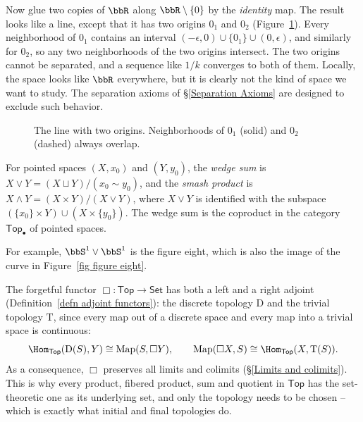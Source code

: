 \begin{example}\label{example two origins}
    Now glue two copies of $\bbR$ along $\bbR\setminus\{0\}$ by the \emph{identity} map. The result looks like a line, except that it has two origins $0_1$ and $0_2$ (Figure~\ref{fig two origins}). Every neighborhood of $0_1$ contains an interval $(-\epsilon,0)\cup\{0_1\}\cup(0,\epsilon)$, and similarly for $0_2$, so any two neighborhoods of the two origins intersect. The two origins cannot be separated, and a sequence like $1/k$ converges to both of them. Locally, the space looks like $\bbR$ everywhere, but it is clearly not the kind of space we want to study. The separation axioms of \S\ref{Separation Axioms} are designed to exclude such behavior.
\end{example}

\begin{figure}[tp]
    \centering
    \caption{The line with two origins. Neighborhoods of $0_1$ (solid) and $0_2$ (dashed) always overlap.}
    \label{fig two origins}
\end{figure}

\begin{defn}
    For pointed spaces $(X,x_0)$ and $(Y,y_0)$, the \emph{wedge sum} is $X\vee Y=(X\sqcup Y)/(x_0\sim y_0)$, and the \emph{smash product} is $X\wedge Y=(X\times Y)/(X\vee Y)$, where $X\vee Y$ is identified with the subspace $(\{x_0\}\times Y)\cup(X\times\{y_0\})$. The wedge sum is the coproduct in the category $\mathsf{Top}_\bullet$ of pointed spaces.
\end{defn}

For example, $\bbS^1\vee\bbS^1$ is the figure eight, which is also the image of the curve in Figure~\ref{fig figure eight}.

\begin{rem}
    The forgetful functor $\Box:\mathsf{Top}\to\mathsf{Set}$ has both a left and a right adjoint (Definition~\ref{defn adjoint functors}): the discrete topology $\mathrm{D}$ and the trivial topology $\mathrm{T}$, since every map out of a discrete space and every map into a trivial space is continuous:
    \[\Hom_{\mathsf{Top}}(\mathrm{D}(S),Y)\cong\mathrm{Map}(S,\Box Y),\qquad \mathrm{Map}(\Box X,S)\cong\Hom_{\mathsf{Top}}(X,\mathrm{T}(S)).\]
    As a consequence, $\Box$ preserves all limits and colimits (\S\ref{Limits and colimits}). This is why every product, fibered product, sum and quotient in $\mathsf{Top}$ has the set-theoretic one as its underlying set, and only the topology needs to be chosen -- which is exactly what initial and final topologies do.
\end{rem}

